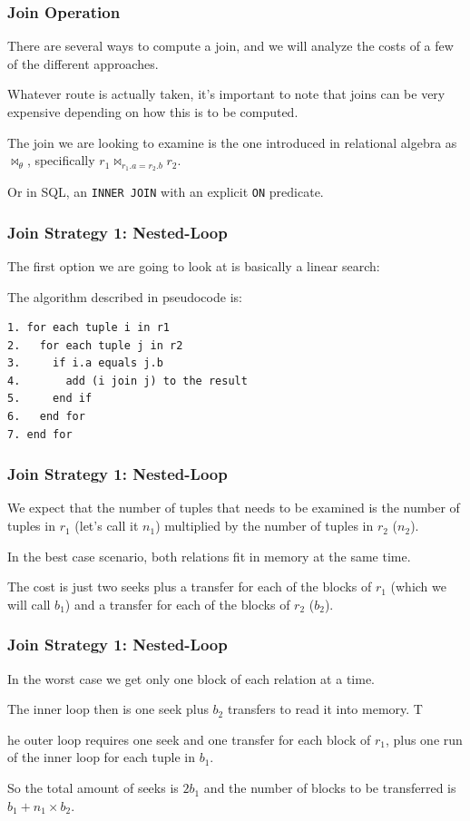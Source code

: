 \begin{frame}
\frametitle{Join Operation}

There are several ways to compute a join, and we will analyze the costs of a few of the different approaches. 

Whatever route is actually taken, it's important to note that joins can be very expensive depending on how this is to be computed. 

The join we are looking to examine is the one introduced in relational algebra as $\Join_{\theta}$, specifically $r_{1} \Join_{r_{1}.a = r_{2}.b} r_{2}$.

Or in SQL, an \texttt{INNER JOIN} with an explicit \texttt{ON} predicate. 

\end{frame}

\begin{frame}[fragile]
\frametitle{Join Strategy 1: Nested-Loop}

The first option we are going to look at is basically a linear search:

The algorithm described in pseudocode is:
\begin{verbatim}
1. for each tuple i in r1
2.   for each tuple j in r2
3.     if i.a equals j.b
4.       add (i join j) to the result
5.     end if
6.   end for
7. end for
\end{verbatim}

\end{frame}

\begin{frame}
\frametitle{Join Strategy 1: Nested-Loop}

We expect that the number of tuples that needs to be examined is the number of tuples in $r_{1}$ (let's call it $n_{1}$) multiplied by the number of tuples in $r_{2}$ ($n_{2}$). 

In the best case scenario, both relations fit in memory at the same time. 

The cost is just two seeks plus a transfer for each of the blocks of $r_{1}$ (which we will call $b_{1}$) and a transfer for each of the blocks of $r_{2}$ ($b_{2}$). 


\end{frame}


\begin{frame}
\frametitle{Join Strategy 1: Nested-Loop}

In the worst case we get only one block of each relation at a time. 

The inner loop then is one seek plus $b_{2}$ transfers to read it into memory. T

he outer loop requires one seek and one transfer for each block of $r_{1}$, plus one run of the inner loop for each tuple in $b_{1}$. 

So the total amount of seeks is $2 b_{1}$ and the number of blocks to be transferred is $b_{1} + n_{1} \times b_{2}$.

\end{frame}

